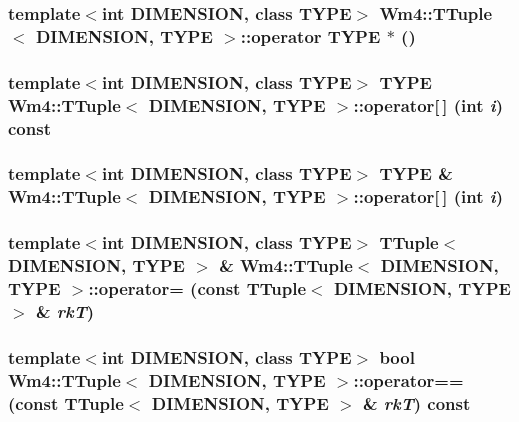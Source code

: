 \subsubsection{\setlength{\rightskip}{0pt plus 5cm}template$<$int DIMENSION, class TYPE$>$ {\bf Wm4::TTuple}$<$ DIMENSION, TYPE $>$::operator TYPE $\ast$ ()}\label{classWm4_1_1TTuple_ac311c3da5d2fcc9fa6c0cf2c796cda3}


\subsubsection{\setlength{\rightskip}{0pt plus 5cm}template$<$int DIMENSION, class TYPE$>$ TYPE {\bf Wm4::TTuple}$<$ DIMENSION, TYPE $>$::operator[$\,$] (int {\em i}) const}\label{classWm4_1_1TTuple_f51bf23c29d7df64d4c72e3105a9414f}


\subsubsection{\setlength{\rightskip}{0pt plus 5cm}template$<$int DIMENSION, class TYPE$>$ TYPE \& {\bf Wm4::TTuple}$<$ DIMENSION, TYPE $>$::operator[$\,$] (int {\em i})}\label{classWm4_1_1TTuple_6ea2360a9c9de80d04d739cd9dde420e}


\subsubsection{\setlength{\rightskip}{0pt plus 5cm}template$<$int DIMENSION, class TYPE$>$ {\bf TTuple}$<$ DIMENSION, TYPE $>$ \& {\bf Wm4::TTuple}$<$ DIMENSION, TYPE $>$::operator= (const {\bf TTuple}$<$ DIMENSION, TYPE $>$ \& {\em rk\-T})}\label{classWm4_1_1TTuple_5ce1feaa5ac7e0acde60c29563abd980}


\subsubsection{\setlength{\rightskip}{0pt plus 5cm}template$<$int DIMENSION, class TYPE$>$ bool {\bf Wm4::TTuple}$<$ DIMENSION, TYPE $>$::operator== (const {\bf TTuple}$<$ DIMENSION, TYPE $>$ \& {\em rk\-T}) const}\label{classWm4_1_1TTuple_31b88cc79b1f75b96b9997f22148abf7}


